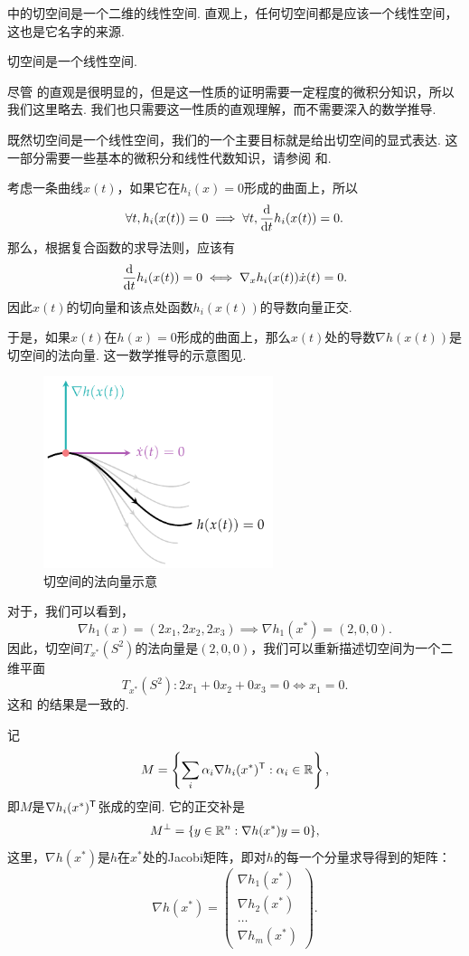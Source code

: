  中的切空间是一个二维的线性空间. 直观上，任何切空间都是应该一个线性空间，这也是它名字的来源. 
\begin{lemma}\label{lemma:tan-space}
    切空间是一个线性空间. 
\end{lemma}

尽管 的直观是很明显的，但是这一性质的证明需要一定程度的微积分知识，所以我们这里略去. 我们也只需要这一性质的直观理解，而不需要深入的数学推导.

既然切空间是一个线性空间，我们的一个主要目标就是给出切空间的显式表达. 这一部分需要一些基本的微积分和线性代数知识，请参阅 和.

考虑一条曲线$x(t)$，如果它在$h_i(x)=0$形成的曲面上，所以
\[\forall t,h_i(x(t))=0\implies\forall t, \frac{\mathrm{d}}{\mathrm{d} t}h_i(x(t))=0.\]
那么，根据复合函数的求导法则，应该有
\[\frac{\mathrm{d}}{\mathrm{d} t}h_i(x(t))=0\iff \nabla_x h_i(x(t))\dot{x}(t)=0.\]
因此$x(t)$的切向量和该点处函数$h_i(x(t))$的导数向量正交. 

于是，如果$x(t)$在$h(x)=0$形成的曲面上，那么$x(t)$处的导数$\nabla h(x(t))$是切空间的法向量. 这一数学推导的示意图见.

\begin{figure}[ht]
\centering
    \includegraphics[width=0.6\textwidth]{figures/duality/tan-1dim.pdf}
\caption{切空间的法向量示意}
\label{fig:tangent-space}
\end{figure}

对于，我们可以看到，
\[\nabla h_1(x)=(2x_1,2x_2,2x_3)\implies \nabla h_1(x^*)=(2,0,0).\]
因此，切空间$T_{x^*}(S^2)$的法向量是$(2,0,0)$，我们可以重新描述切空间为一个二维平面
\[T_{x^*}(S^2): 2x_1+0x_2+0x_3=0\iff x_1=0.\]
这和 的结果是一致的.

记
\[M=\left\{\sum_{i} \alpha_i \nabla h_i(x^*)^{\mathsf{T}}:\alpha_i\in\mathbb{R}\right\},\]
即$M$是$\nabla h_i(x^*)^{\mathsf{T}}$张成的空间. 它的正交补是
\[M^\perp=\{{y}\in\mathbb{R}^n:\nabla {h(x^*)y}=0\},\]
这里，$\nabla {h(x^*)}$是$h$在$x^*$处的Jacobi矩阵，即对$h$的每一个分量求导得到的矩阵：
\[\nabla {h(x^*)}=\begin{pmatrix}
    \nabla h_1(x^*)\\
    \nabla h_2(x^*)\\
    \dots\\
    \nabla h_m(x^*)
\end{pmatrix}.\]

